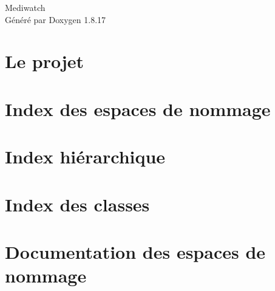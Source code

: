 \let\mypdfximage\pdfximage\def\pdfximage{\immediate\mypdfximage}\documentclass[twoside]{book}
\newcommand{\+}{\discretionary{\mbox{\scriptsize$\hookleftarrow$}}{}{}}
\newcommand{\clearemptydoublepage}{%
  \newpage{\pagestyle{empty}\cleardoublepage}%
}
\begin{document}
\hypersetup{pageanchor=false,
             bookmarksnumbered=true,
             pdfencoding=unicode
            }
\begin{titlepage}
\vspace*{7cm}
\begin{center}%
{\Large Mediwatch }\\
\vspace*{1cm}
{\large Généré par Doxygen 1.8.17}\\
\end{center}
\end{titlepage}
\clearemptydoublepage
{}
\tableofcontents
\clearemptydoublepage
{}
\hypersetup{pageanchor=true}

\chapter{Le projet}
\label{index}\hypertarget{index}{}
\chapter{Index des espaces de nommage}

\chapter{Index hiérarchique}

\chapter{Index des classes}

\chapter{Documentation des espaces de nommage}






























\end{document}
